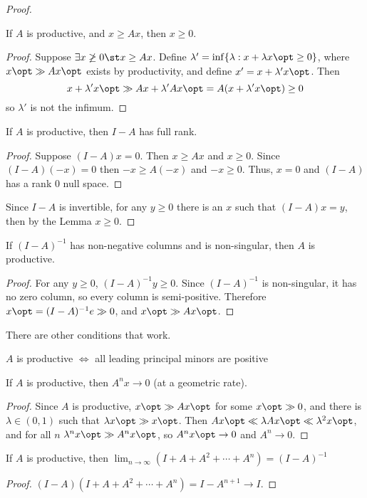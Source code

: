 \documentclass[10pt]{article}
\begin{document}
\begin{proof}
\begin{lemma}
	If $A$ is productive, and $x \ge Ax$, then $x \ge 0$.
\end{lemma}
\begin{proof}
	Suppose $\exists x \not\ge 0 \st x \ge Ax$. Define $\lambda' = \inf \{\lambda : x + \lambda x\opt \ge 0\}$, where $x\opt \gg Ax\opt$ exists by productivity, and define $x' = x + \lambda'x\opt$. Then \[x+\lambda'x\opt \gg Ax + \lambda' Ax\opt = A(x + \lambda 'x\opt) \ge 0\]so $\lambda'$ is not the infimum.
\end{proof}
\begin{corollary}
	If $A$ is productive, then $I-A$ has full rank.
\end{corollary}
\begin{proof}
Suppose $(I-A)x = 0$. Then $x \ge Ax$ and $x \ge 0$. Since $(I-A)(-x) = 0$ then $-x\ge A(-x)$ and $-x \ge 0$. Thus, $x = 0$ and $(I-A)$ has a rank 0 null space.
\end{proof}

Since $I-A$ is invertible, for any $y \ge 0$ there is an $x$ such that $(I-A)x = y$, then by the Lemma $x \ge 0$.
\end{proof}


\begin{theorem}
	If $(I-A)^{-1}$ has non-negative columns and is non-singular, then $A$ is productive.
\end{theorem}
\begin{proof}
	For any $y\ge0$, $(I-A)^{-1}y \ge 0$. Since $(I-A)^{-1}$ is non-singular, it has no zero column, so every column is semi-positive. Therefore $x\opt = (I-A)^{-1}e \gg 0$, and $x\opt \gg Ax\opt$.
\end{proof}

\begin{remark}
	There are other conditions that work.
\end{remark}
\begin{theorem}
	 $A$ is productive $\Longleftrightarrow$ all leading principal minors are positive
\end{theorem}


\begin{theorem}
	If $A$ is productive, then $A^n x \to 0$ (at a geometric rate).
\end{theorem}
\begin{proof}
	Since $A$ is productive, $x\opt \gg Ax\opt$ for some $x\opt \gg 0$, and there is $\lambda \in (0,1)$ such that $\lambda x\opt \gg x\opt$. Then $Ax\opt \ll \lambda Ax\opt \ll \lambda^2x\opt$, and for all $n$ $\lambda^nx\opt \gg A^nx\opt$, so $A^nx\opt \to 0$ and $A^n \to 0$.
\end{proof}
\begin{corollary}
	If $A$ is productive, then $\lim_{n\to\infty} (I + A + A^2 + \cdots + A^n) = (I-A)^{-1}$
\end{corollary}
\begin{proof}
	$(I-A)(I + A + A^2 + \cdots + A^n) = I - A^{n+1} \to I$.
\end{proof}
\end{document}
